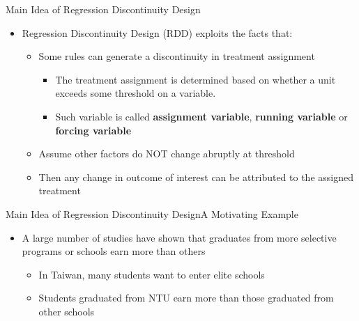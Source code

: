 \documentclass[hyperref={pdfpagelabels=false}]{beamer}
\begin{document}
	\begin{frame}{Main Idea of Regression Discontinuity Design}{}
	\begin{itemize}
		\item Regression Discontinuity Design (RDD) exploits the facts that:
		\vspace{0.2cm}
		\begin{itemize}	
			\item Some rules can generate a discontinuity in treatment assignment
			\vspace{0.2cm}
			\begin{itemize}	
				\item The treatment assignment is determined based on whether a unit exceeds some threshold on a variable. 
				\vspace{0.2cm}
				\item Such variable is called \textbf{assignment variable}, \textbf{running variable} or \textbf{forcing variable}
			\end{itemize}
			\vspace{0.2cm}
			\item Assume other factors do NOT change abruptly at threshold
			\vspace{0.2cm}
			\item Then any change in outcome of interest can be attributed to the assigned treatment
		\end{itemize}
		
	\end{itemize}
\end{frame}

	
	
	
	
	
	
	\begin{frame}{Main Idea of Regression Discontinuity Design}{A Motivating Example}
		\begin{itemize}
			\item A large number of studies have shown that graduates from more
			selective programs or schools earn more than others
			\vspace{0.2cm}
			\begin{itemize}
				\item In Taiwan, many students want to enter elite schools
				\vspace{0.2cm}
				\item Students graduated from NTU earn more than those graduated from other schools
			\end{itemize}
			
		\end{itemize}
	\end{frame}
	
\end{document}
